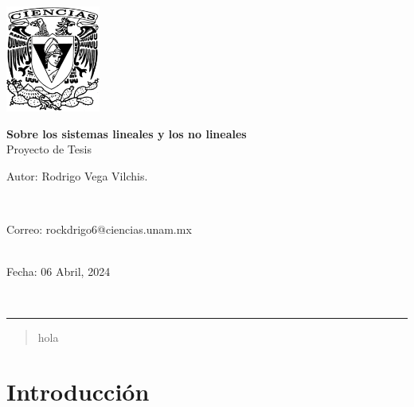 \documentclass[11pt,a4paper]{article}
\begin{document}
\thispagestyle{empty}
\includegraphics[height=3.5cm]{escudoCiencias.pdf}
\vspace{-3.8cm}
\begin{flushright}
\hspace{4cm}
{\Large\textbf{Sobre los sistemas lineales y los no lineales}\\
Proyecto de Tesis}
\vspace{0.3cm}\\
\begin{large}Autor: Rodrigo Vega Vilchis.\end{large}\\
\begin{footnotesize}
Correo: rockdrigo6@ciencias.unam.mx\\
\\
\end{footnotesize}
\vspace{0.1cm}
\begin{large}
Fecha: 06 Abril, 2024\end{large}\\
\end{flushright}
 \hrule height1pt\vspace{.5cm}

\begin{abstract}
hola
\end{abstract} 

\section{Introducción}
\end{document}

